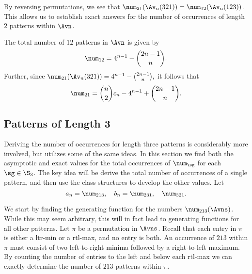 \documentclass[12pt,twoside]{memoir}
\begin{document}
      By reversing permutations, we see that $\num_{21}(\Av_n(321)) =
      \num_{12}(\Av_n(123))$. This allows us to establish exact answers for the
      number of occurrences of length $2$ patterns within $\Avn$. 

      \begin{proposition} \label{prop:2-patterns}
        The total number of $12$ patterns in $\Avn$ is given by 
        $$ \num_{12} = 4^{n-1} - \binom{2n - 1}{n}.$$
        Further, since 
        $ \num_{21}(\Av_n(321)) = 4^{n-1} - \binom{2n - 1}{n},$
        it follows that 
        $$ \num_{21} = \binom{n}{2} c_n - 4^{n-1} + \binom{2n - 1}{n}.$$
      \end{proposition}


    \subsection{Patterns of Length 3}

      Deriving the number of occurrences for length three patterns is considerably
      more involved, but utilizes some of the same ideas. In this section we find
      both the asymptotic and exact values for the total occurrences of $\num_\sg$
      for each $\sg \in \S_3$.  The key idea will be derive the total number of
      occurrences of a single pattern, and then use the class structures to develop
      the other values. 
      Let 
      $$a_n = \num_{213}, \quad b_n = \num_{231}, \quad \num_{321}.$$



      We start by finding the generating function for the numbers
      $\num_{213}(\Avns)$. While this may seem arbitrary, this will in fact lead
      to generating functions for all other patterns.  Let $\pi$ be a permutation
      in $\Avns$. Recall that each entry in $\pi$ is either a ltr-min or a
      rtl-max, and no entry is both. An occurrence of $213$ within $\pi$ must
      consist of two left-to-right minima followed by a right-to-left maximum. By
      counting the number of entries to the left and below each rtl-max we can
      exactly determine the number of $213$ patterns within $\pi$. 
      
\end{document}
